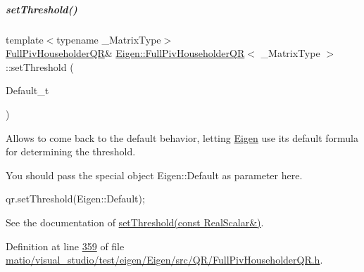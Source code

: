 \mbox{\label{group___q_r___module_aaea4bf3dd145e0cddb16e364cca9d887}} 
\subparagraph{\texorpdfstring{set\+Threshold()}{setThreshold()}\hspace{0.1cm}{\footnotesize\ttfamily [4/4]}}
{\footnotesize\ttfamily template$<$typename \+\_\+\+Matrix\+Type$>$ \\
\hyperlink{group___q_r___module_class_eigen_1_1_full_piv_householder_q_r}{Full\+Piv\+Householder\+QR}\& \hyperlink{group___q_r___module_class_eigen_1_1_full_piv_householder_q_r}{Eigen\+::\+Full\+Piv\+Householder\+QR}$<$ \+\_\+\+Matrix\+Type $>$\+::set\+Threshold (\begin{DoxyParamCaption}\item[{Default\+\_\+t}]{ }\end{DoxyParamCaption})\hspace{0.3cm}{\ttfamily [inline]}}

Allows to come back to the default behavior, letting \hyperlink{namespace_eigen}{Eigen} use its default formula for determining the threshold.

You should pass the special object Eigen\+::\+Default as parameter here. 
\begin{DoxyCode}
qr.setThreshold(Eigen::Default); 
\end{DoxyCode}


See the documentation of \hyperlink{group___q_r___module_a92277e572bf98245891015d12dd2b602}{set\+Threshold(const Real\+Scalar\&)}. 

Definition at line \hyperlink{matio_2visual__studio_2test_2eigen_2_eigen_2src_2_q_r_2_full_piv_householder_q_r_8h_source_l00359}{359} of file \hyperlink{matio_2visual__studio_2test_2eigen_2_eigen_2src_2_q_r_2_full_piv_householder_q_r_8h_source}{matio/visual\+\_\+studio/test/eigen/\+Eigen/src/\+Q\+R/\+Full\+Piv\+Householder\+Q\+R.\+h}.

